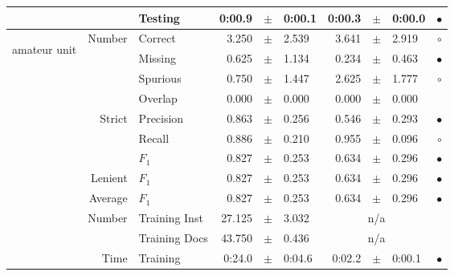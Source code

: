 \begin{longtable}{|r|r|l||rcl|rcl|c|}
\cline{3-10} &                             &         Testing &      0:00.9 &  $\pm$  &      0:00.1 &      0:00.3 &  $\pm$  &      0:00.0 & $\bullet$ \\
\hline
\hline
\multirow{11}{*}{\begin{sideways}amateur unit\end{sideways} }
             & \multirow{4}{*}{    Number} &         Correct &       3.250 &  $\pm$  &       2.539 &       3.641 &  $\pm$  &       2.919 & $\circ$ \\
\cline{3-10} &                             &         Missing &       0.625 &  $\pm$  &       1.134 &       0.234 &  $\pm$  &       0.463 & $\bullet$ \\
\cline{3-10} &                             &        Spurious &       0.750 &  $\pm$  &       1.447 &       2.625 &  $\pm$  &       1.777 & $\circ$ \\
\cline{3-10} &                             &         Overlap &       0.000 &  $\pm$  &       0.000 &       0.000 &  $\pm$  &       0.000 &  \\
\cline{2-10} & \multirow{3}{*}{    Strict} &       Precision &       0.863 &  $\pm$  &       0.256 &       0.546 &  $\pm$  &       0.293 & $\bullet$ \\
\cline{3-10} &                             &          Recall &       0.886 &  $\pm$  &       0.210 &       0.955 &  $\pm$  &       0.096 & $\circ$ \\
\cline{3-10} &                             &           $F_1$ &       0.827 &  $\pm$  &       0.253 &       0.634 &  $\pm$  &       0.296 & $\bullet$ \\
\cline{2-10} &                     Lenient &           $F_1$ &       0.827 &  $\pm$  &       0.253 &       0.634 &  $\pm$  &       0.296 & $\bullet$ \\
\cline{2-10} &                     Average &           $F_1$ &       0.827 &  $\pm$  &       0.253 &       0.634 &  $\pm$  &       0.296 & $\bullet$ \\
\cline{2-10} & \multirow{2}{*}{    Number} &   Training Inst &      27.125 &  $\pm$  &       3.032 &    \multicolumn{3}{c|}{n/a}         &  \\
\cline{3-10} &                             &   Training Docs &      43.750 &  $\pm$  &       0.436 &    \multicolumn{3}{c|}{n/a}         &  \\
\cline{2-10} & \multirow{2}{*}{      Time} &        Training &      0:24.0 &  $\pm$  &      0:04.6 &      0:02.2 &  $\pm$  &      0:00.1 & $\bullet$ \\

\end{longtable}
